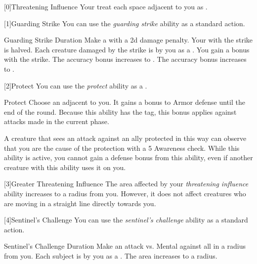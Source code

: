         [0]{Threatening Influence} Your  treat each space adjacent to you as .

        [1]{Guarding Strike} You can use the \textit{guarding strike} ability as a standard action.
        \begin{durationability}{Guarding Strike}
            Duration
            \rankline
            Make a  with a \minus2d damage penalty.
            Your  with the strike is halved.
            Each creature damaged by the strike is \goaded by you as a .
            \rankline
             You gain a   bonus with the strike.
             The accuracy bonus increases to .
             The accuracy bonus increases to .
        \end{durationability}

        [2]{Protect} You can use the \textit{protect} ability as a .
        \begin{durationability}{Protect}
            \rankline
            Choose an  adjacent to you.
            It gains a  bonus to Armor defense until the end of the round.
            Because this ability has the  tag, this bonus applies against attacks made in the current phase.

            A creature that sees an attack against an ally protected in this way can observe that you are the cause of the protection with a  5 Awareness check.
            While this ability is active, you cannot gain a defense bonus from this ability, even if another creature with this ability uses it on you.
        \end{durationability}

        [3]{Greater Threatening Influence} The area affected by your \textit{threatening influence} ability increases to a \smallarea radius  from you.
        However, it does not affect creatures who are moving in a straight line directly towards you.

        [4]{Sentinel's Challenge} You can use the \textit{sentinel's challenge} ability as a standard action.
        \begin{durationability}{Sentinel's Challenge}
            Duration
            \rankline
            Make an attack vs. Mental against all  in a \largearea radius from you.
            \hit Each subject is \goaded by you as a .
            \rankline
             The area increases to a \hugearea radius.
        \end{durationability}

